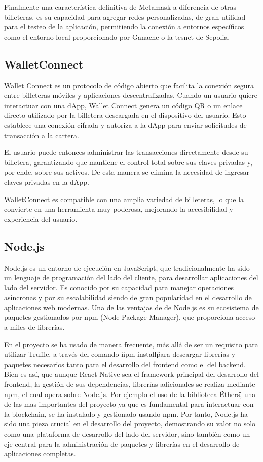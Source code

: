 Finalmente una característica definitiva de Metamask a diferencia de otras billeteras, es su capacidad para agregar redes personalizadas, de gran utilidad para el testeo de la aplicación, permitiendo la conexión a entornos específicos como el entorno local proporcionado por Ganache o la tesnet de Sepolia.


\subsection{WalletConnect}

Wallet Connect es un protocolo de código abierto que facilita la conexión segura entre billeteras móviles y aplicaciones descentralizadas.
Cuando un usuario quiere interactuar con una dApp, Wallet Connect genera un código QR o un enlace directo utilizado por la billetera descargada en el dispositivo del usuario. Esto establece una conexión cifrada y autoriza a la dApp para enviar solicitudes de transacción a la cartera.

El usuario puede entonces administrar las transacciones directamente desde su billetera, garantizando que mantiene el control total sobre sus claves privadas y, por ende, sobre sus activos. 
De esta manera se elimina la necesidad de ingresar claves privadas en la dApp.

WalletConnect es compatible con una amplia variedad de billeteras, lo que la convierte en una herramienta muy poderosa, mejorando la accesibilidad y experiencia del usuario.


\subsection{Node.js}

Node.js es un entorno de ejecución en JavaScript, que tradicionalmente ha sido un lenguaje de programación del lado del cliente, para desarrollar aplicaciones del lado del servidor. Es conocido por su capacidad para manejar operaciones asíncronas y por su escalabilidad siendo de gran popularidad en el desarrollo de aplicaciones web modernas. Una de las ventajas de de Node.js es su ecosistema de paquetes gestionados por npm (Node Package Manager), que proporciona acceso a miles de librerías.

En el proyecto se ha usado de manera frecuente, más allá de ser un requisito para utilizar Truffle, a través del comando \"npm install\" para descargar librerías y paquetes necesarios tanto para el desarrollo del frontend como el del backend.
Bien es así, que aunque React Native sea el framework principal del desarrollo del frontend, la gestión de sus dependencias, librerías adicionales se realiza mediante npm, el cual opera sobre Node.js.
Por ejemplo el uso de la biblioteca \"Ethers\", una de las mas importantes del proyecto ya que es fundamental para interactuar con la blockchain, se ha instalado y gestionado usando npm.
Por tanto, Node.js ha sido una pieza crucial en el desarrollo del proyecto, demostrando su valor no solo como una plataforma de desarrollo del lado del servidor, sino también como un eje central para la administración de paquetes y librerías en el desarrollo de aplicaciones completas.


